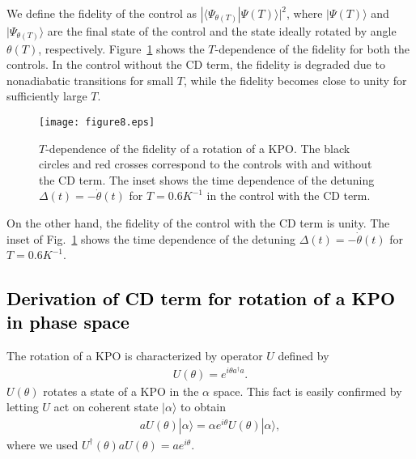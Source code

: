 \documentclass[%
 reprint,
 amsmath,amssymb,
 aps,
pra,
]{revtex4-2}
\begin{document}
We define the fidelity of the control as $|\langle\Psi_{\theta(T)}|\Psi(T)\rangle|^2$, where $|\Psi(T)\rangle$ and $|\Psi_{\theta(T)}\rangle$ are the final state of the control and the state ideally rotated by angle $\theta(T)$, respectively.
Figure~\ref{fid_com_11_28_21} shows the $T$-dependence of the fidelity for both the controls.
In the control without the CD term, the fidelity is degraded due to nonadiabatic transitions for small $T$, while the fidelity becomes close to unity for sufficiently large $T$.
\begin{figure}[h!]
\begin{center}
\texttt{[image: figure8.eps]}
\end{center}
\caption{
$T$-dependence of the fidelity of a rotation of a KPO.
The black circles and red crosses correspond to the controls with and without the CD term.
The inset shows the time dependence of the detuning $\Delta(t) = -\dot\theta(t)$ for $T=0.6K^{-1}$ in the control with the CD term.
}
\label{fid_com_11_28_21}
\end{figure}
On the other hand, the fidelity of the control with the CD term is unity.
The inset of Fig.~\ref{fid_com_11_28_21} shows the time dependence of the detuning $\Delta(t) = -\dot\theta(t)$ for $T=0.6K^{-1}$.


\textcolor{black}{
\section{Derivation of CD term for rotation of a KPO in phase space}
\label{Theory of rotation}
}
The rotation of a KPO is characterized by operator $U$ defined by
\begin{eqnarray}
U(\theta) = e^{i\theta a^\dagger a}.
\label{U_11_29_21_2}
\end{eqnarray}
$U(\theta)$ rotates a state of a KPO in the $\alpha$ space.
This fact is easily confirmed by letting $U$ act on coherent state $|\alpha\rangle$ to obtain
\begin{eqnarray}
a U(\theta) |\alpha\rangle = \alpha e^{i\theta} U(\theta) |\alpha\rangle,
\end{eqnarray}
where we used $U^\dagger(\theta) a U(\theta)=a e^{i\theta}$.
\end{document}
